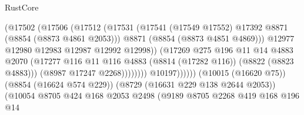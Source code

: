 \begin{lexlean}{RustCore}
\begin{coremodule}
                                              (@17502
                                                (@17506
                                                  (@17512
                                                    (@17531
                                                      (@17541
                                                        (@17549 @17552)
                                                        @17392
                                                        @8871
                                                        (@8854 (@8873 @4861 @2053)))
                                                      @8871
                                                      (@8854 (@8873 @4851 @4869)))
                                                    @12977
                                                    @12980
                                                    @12983
                                                    @12987
                                                    @12992
                                                    @12998))
                                                (@17269
                                                  @275
                                                  @196
                                                  @11
                                                  @14
                                                  @4883
                                                  @2070
                                                  (@17277
                                                    @116
                                                    @11
                                                    @116
                                                    @4883
                                                    (@8814 (@17282 @116))
                                                    (@8822 (@8823 @4883)))
                                                  (@8987 @17247 @2268))))))))
                                    @10197))))))
                        (@10015 (@16620 @75))
                        (@8854 (@16624 @574 @229))
                        (@8729 (@16631 @229 @138 @2644 @2053))
                        (@10054
                          @8705
                          @424
                          @168
                          @2053
                          @2498
                          (@9189
                            @8705
                            @2268
                            @419
                            @168
                            @196
                            @14

\end{coremodule}
\end{lexlean}
